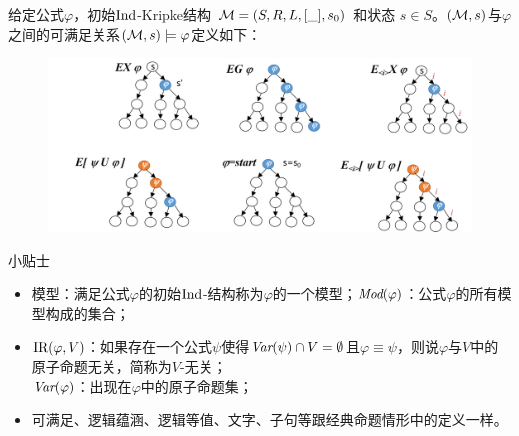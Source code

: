 \documentclass[9pt, CJK]{beamer}
\begin{document}
\begin{frame}
{\begin{definition}
			给定公式$\varphi$，初始$\textrm{Ind}$-Kripke结构 ${\cal M}=(S,R,L,[\_],s_0)$ 和状态 $s\in S$。$({\cal M},s)$与$\varphi$之间的可满足关系$({\cal M},s)\models \varphi$定义如下：
			\begin{figure}
				\includegraphics[scale=0.3]{figures/semanticCTL}
			\end{figure}
	\end{definition}%
\begin{block}{{\footnotesize 小贴士}}
	\tiny{
		\begin{itemize}
			\item \textcolor{blue!80}{模型}：满足公式$\varphi$的初始$\textrm{Ind}$-结构称为$\varphi$的一个模型；\qquad $\textit{Mod}(\varphi)$：公式$\varphi$的所有模型构成的集合； 
			\item \textcolor{blue!80}{$\textrm{IR}(\varphi,V)$}：如果存在一个公式$\psi$使得$\textit{Var}(\psi) \cap V = \emptyset$且$\varphi \equiv \psi$，则说$\varphi$与$V$中的原子命题\textcolor{blue!80}{无关}，简称为\textcolor{blue!80}{$V$-无关}；\\ $\textit{Var}(\varphi)$：出现在$\varphi$中的原子命题集；
			\item 可满足、逻辑蕴涵、逻辑等值、文字、子句等跟经典命题情形中的定义一样。
		\end{itemize}
	}
\end{block}
}
\end{frame}
\end{document}
